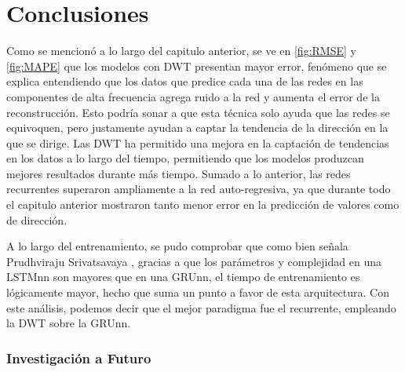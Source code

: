 \chapter{Conclusiones} 
\label{cap:conclusiones} 

Como se mencionó a lo largo del capitulo anterior, se ve en \ref{fig:RMSE} y \ref{fig:MAPE} que los modelos con DWT presentan mayor error, fenómeno que se explica entendiendo que los datos que predice cada una de las redes en las componentes de alta frecuencia agrega ruido a la red y aumenta el error de la reconstrucción. Esto podría sonar a que esta técnica solo ayuda que las redes se equivoquen, pero justamente ayudan a captar la tendencia de la dirección en la que se dirige. Las DWT ha permitido una mejora en la captación de tendencias en los datos a lo largo del tiempo, permitiendo que los modelos produzcan mejores resultados durante más tiempo. Sumado a lo anterior, las redes recurrentes superaron ampliamente a la red auto-regresiva, ya que durante todo el capitulo anterior mostraron tanto menor error en la predicción de valores como de dirección.

A lo largo del entrenamiento, se pudo comprobar que como bien señala Prudhviraju Srivatsavaya \cite{GRU_vs_LSTM}, gracias a que los parámetros y complejidad en una LSTMnn son mayores que en una GRUnn, el tiempo de entrenamiento es lógicamente mayor, hecho que suma un punto a favor de esta arquitectura. Con este análisis, podemos decir que el mejor paradigma fue el recurrente, empleando la DWT sobre la GRUnn.


\subsection{Investigación a Futuro}

